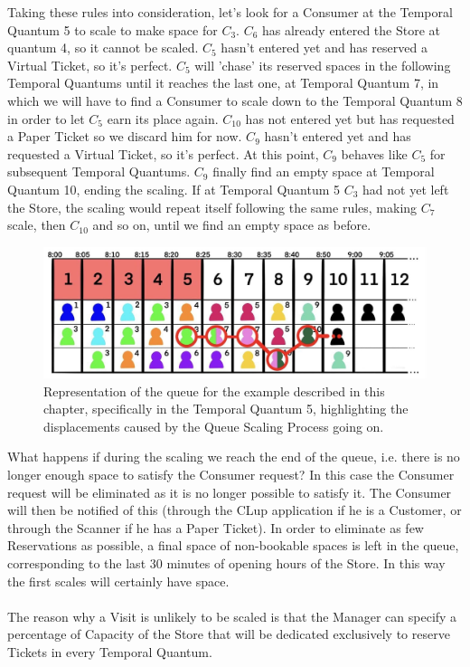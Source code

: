 \documentclass[a4paper, 12pt, oneside, table]{article}
\begin{document}
    Taking these rules into consideration, let's look for a Consumer at the Temporal Quantum 5 to scale to make space for $ C_3 $. $ C_6 $ has already entered the Store at quantum 4, so it cannot be scaled. $ C_5 $ hasn't entered yet and has reserved a Virtual Ticket, so it's perfect. $ C_5 $ will 'chase' its reserved spaces in the following Temporal Quantums until it reaches the last one, at Temporal Quantum 7, in which we will have to find a Consumer to scale down to the Temporal Quantum 8 in order to let $ C_5 $ earn its place again. $ C_10 $ has not entered yet but has requested a Paper Ticket so we discard him for now. $ C_9 $ hasn't entered yet and has requested a Virtual Ticket, so it's perfect. At this point, $ C_9 $ behaves like $ C_5 $ for subsequent Temporal Quantums. $ C_9 $ finally find an empty space at Temporal Quantum 10, ending the scaling. If at Temporal Quantum 5 $ C_3 $ had not yet left the Store, the scaling would repeat itself following the same rules, making $ C_7 $ scale, then $ C_10 $ and so on, until we find an empty space as before.
\begin{figure}[hbt]
\centering
    \centering
    \includegraphics[height=0.15\textheight, scale=0.2, keepaspectratio]{img/queue/queue_ex3.jpg} 
    \caption{Representation of the queue for the example described in this chapter, specifically in the Temporal Quantum 5, highlighting the displacements caused by the Queue Scaling Process going on.}
    \label{queueex3}
\end{figure}

What happens if during the scaling we reach the end of the queue, i.e. there is no longer enough space to satisfy the Consumer request? In this case the Consumer request will be eliminated as it is no longer possible to satisfy it. The Consumer will then be notified of this (through the CLup application if he is a Customer, or through the Scanner if he has a Paper Ticket). In order to eliminate as few Reservations as possible, a final space of non-bookable spaces is left in the queue, corresponding to the last 30 minutes of opening hours of the Store. In this way the first scales will certainly have space.\\
\\
The reason why a Visit is unlikely to be scaled is that the Manager can specify a percentage of Capacity of the Store that will be dedicated exclusively to reserve Tickets in every Temporal Quantum.
\end{document}

